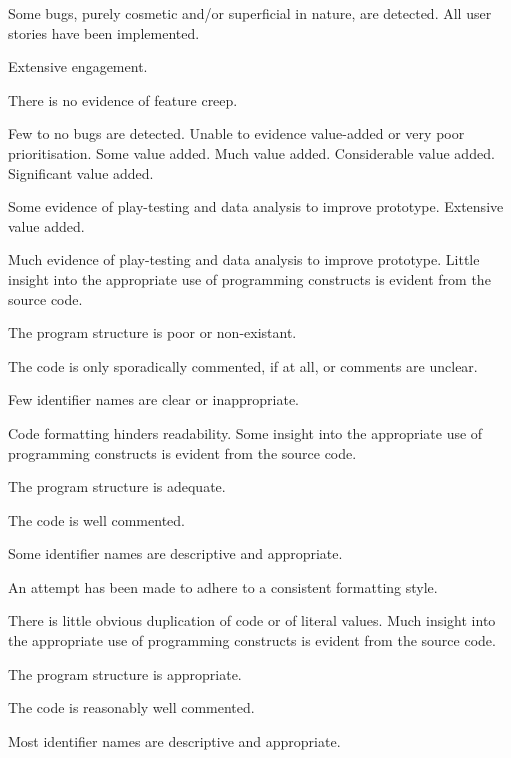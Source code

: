 \documentclass{../../fal_assignment}
\begin{document}
\begin{markingrubric}
            \par Some bugs, purely cosmetic and/or superficial in nature, are detected.
        \grade All user stories have been implemented.
            \par Extensive engagement.
            \par There is no evidence of feature creep.
            \par Few to no bugs are detected.
%
        \grade \fail Unable to evidence value-added or very poor prioritisation.
        \grade Some value added.
        \grade Much value added.
        \grade Considerable value added.
        \grade Significant value added.
            \par Some evidence of play-testing and data analysis to improve prototype.
        \grade Extensive value added.
            \par Much evidence of play-testing and data analysis to improve prototype.
%
        \grade \fail Little insight into the appropriate use of programming constructs is evident from the source code.
            \par The program structure is poor or non-existant.
            \par The code is only sporadically commented, if at all, or comments are unclear.
            \par Few identifier names are clear or inappropriate.
            \par Code formatting hinders readability.
        \grade Some insight into the appropriate use of programming constructs is evident from the source code.
            \par The program structure is adequate.
            \par The code is well commented.
            \par Some identifier names are descriptive and appropriate.
            \par An attempt has been made to adhere to a consistent formatting style.
             \par There is little obvious duplication of code or of literal values.   
        \grade Much insight into the appropriate use of programming constructs is evident from the source code.
            \par The program structure is appropriate.
            \par The code is reasonably well commented.
            \par Most identifier names are descriptive and appropriate.

\end{markingrubric}
\end{document}
